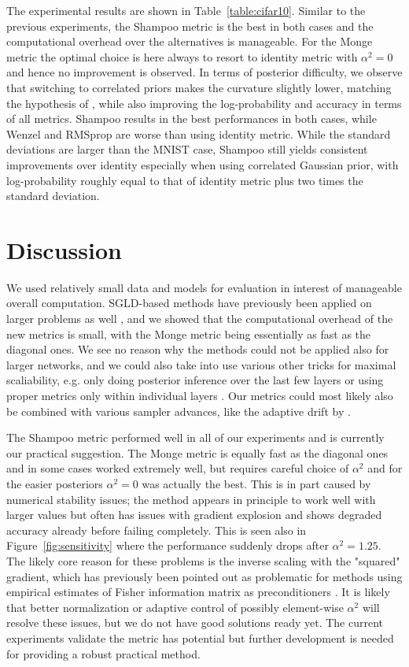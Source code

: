 \documentclass[10pt]{article} %
\theoremstyle{plain}
\theoremstyle{definition}
\theoremstyle{remark}
\begin{document}
The experimental results are shown in Table~\ref{table:cifar10}. Similar to the previous experiments, the Shampoo metric is the best in both cases and the computational overhead over the alternatives is manageable. For the Monge metric the optimal choice is here always to resort to identity metric with $\alpha^{2}=0$ and hence no improvement is observed. In terms of posterior difficulty, we observe that switching to correlated priors makes the curvature slightly lower, matching the hypothesis of \citet{Fortuin2022}, while also improving the log-probability and accuracy in terms of all metrics. Shampoo results in the best performances in both cases, while Wenzel and RMSprop are worse than using identity metric. While the standard deviations are larger than the MNIST case, Shampoo still yields consistent improvements over identity especially when using correlated Gaussian prior, with log-probability roughly equal to that of identity metric plus two times the standard deviation.

\section{Discussion}

We used relatively small data and models for evaluation in interest of manageable overall computation. SGLD-based methods have previously been applied on larger problems as well \citep{Zhang2020}, and we showed that the computational overhead of the new metrics is small, with the Monge metric being essentially as fast as the diagonal ones. We see no reason why the methods could not be applied also for larger networks, and we could also take into use various other tricks for maximal scaliability, e.g. only doing posterior inference over the last few layers \citep{Lazaro-Gredilla2010,Ober2019,Watson2021} or using proper metrics only within individual layers 
\citep{Gupta2018,Anil2021}. Our metrics could most likely also be combined with various sampler advances, like the adaptive drift by \citet{Kim2020}.

The Shampoo metric performed well in all of our experiments and is currently our practical suggestion. The Monge metric is equally fast as the diagonal ones and in some cases worked extremely well, but requires careful choice of $\alpha^{2}$ and for the easier posteriors $\alpha^{2}=0$ was actually the best. This is in part caused by numerical stability issues; the method appears in principle to work well with larger values but often has issues with gradient explosion and shows degraded accuracy already before failing completely. This is seen also in Figure~\ref{fig:sensitivity} where the performance suddenly drops after $\alpha^{2}=1.25$. 
The likely core reason for these problems is the inverse scaling with the "squared" gradient, which has previously been pointed out as problematic for methods using empirical estimates of Fisher information matrix as preconditioners \citep{Kunstner2019}. It is likely that better normalization or adaptive control of possibly element-wise $\alpha^{2}$ will resolve these issues, but we do not have good solutions ready yet. The current experiments validate the metric has potential but further development is needed for providing a robust practical method.
\end{document}
